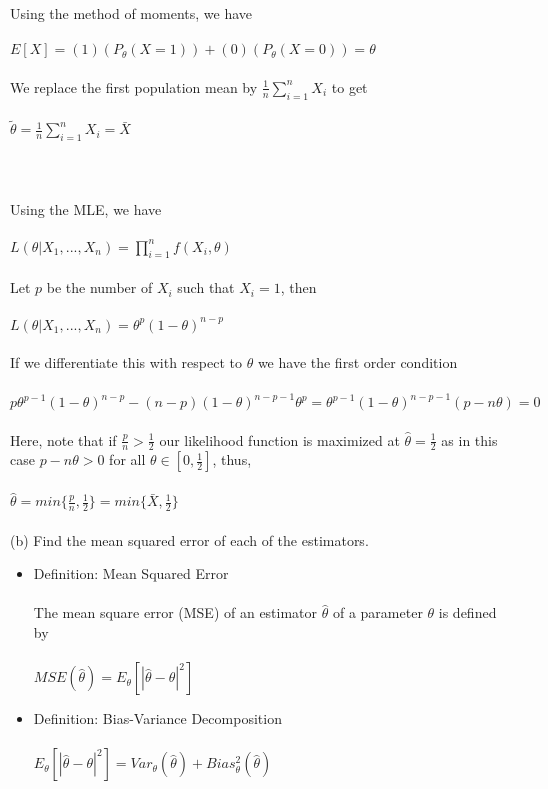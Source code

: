 \documentclass{article}
\begin{document}
Using the method of moments, we have\\\\
$E[X]=(1)(P_\theta(X=1))+(0)(P_\theta(X=0))=\theta$\\\\
We replace the first population mean by $\frac{1}{n}\sum_{i=1}^nX_i$ to get\\\\
$\tilde{\theta}=\frac{1}{n}\sum_{i=1}^nX_i=\bar{X}$\\\\\\\\
Using the MLE, we have\\\\
$L(\theta|X_1,...,X_n)=\prod_{i=1}^nf(X_i,\theta)$\\\\
Let $p$ be the number of $X_i$ such that $X_i=1$, then\\\\
$L(\theta|X_1,...,X_n)=\theta^p(1-\theta)^{n-p}$\\\\
If we differentiate this with respect to $\theta$ we have the first order condition\\\\
$p\theta^{p-1}(1-\theta)^{n-p}-(n-p)(1-\theta)^{n-p-1}\theta^p=\theta^{p-1}(1-\theta)^{n-p-1}(p-n\theta)=0$\\\\
Here, note that if $\frac{p}{n}>\frac{1}{2}$ our likelihood function is maximized at $\hat{\theta}=\frac{1}{2}$ as in this case $p-n\theta>0$ for all $\theta\in[0,\frac{1}{2}]$, thus,\\\\
$\hat{\theta}=min\{\frac{p}{n},\frac{1}{2}\}=min\{\bar{X},\frac{1}{2}\}$\\\\
(b) Find the mean squared error of each of the estimators.
\begin{itemize}
    \item Definition: Mean Squared Error\\\\
    The mean square error (MSE) of an estimator $\hat{\theta}$ of a parameter $\theta$ is defined by\\\\
    $MSE(\hat{\theta})=E_\theta[|\hat{\theta}-\theta|^2]$
    \item Definition: Bias-Variance Decomposition\\\\
    $E_\theta[|\hat{\theta}-\theta|^2]=Var_\theta(\hat{\theta})+Bias_\theta^2(\hat{\theta})$
\end{itemize}
\end{document}
